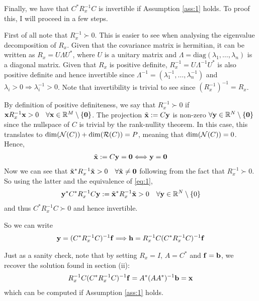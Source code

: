 \documentclass{article}
\begin{document}
\begin{enumerate}[label=(\roman*)]
        Finally, we have that $C^* R_x^{-1} C$ is invertible if Assumption \ref{ass:1} holds. To proof this, I will proceed in a few steps.
        
        First of all note that $R_x^{-1} \succ 0$. This is easier to see when analysing the eigenvalue decomposition of $R_x$. Given that the covariance matrix is hermitian, it can be written as $R_x = U \Lambda U^*$, where $U$ is a unitary matrix and $\Lambda = \text{diag}(\lambda_1,\dots, \lambda_n)$ is a diagonal matrix. Given that $R_x$ is positive definite, $R_x^{-1} = U \Lambda^{-1} U^*$ is also positive definite and hence invertible since $\Lambda^{-1} = (\lambda_1^{-1},\dots, \lambda_n^{-1})$ and $\lambda_i > 0 \Longrightarrow \lambda_i^{-1} > 0$. Note that invertibility is trivial to see since $(R_x^{-1})^{-1}=R_x$.
        
        By definition of positive definiteness, we say that $R_x^{-1}\succ 0$ if $\mathbf{x} R_x^{-1} \mathbf{x} > 0\quad \forall \mathbf{x} \in \mathbb{R}^M \setminus \{\mathbf{0}\}$. The projection $\tilde{\mathbf{x}} := C \mathbf{y}$ is non-zero $\forall \mathbf{y} \in \mathbb{R}^N \setminus \{\mathbf{0}\}$ since the nullspace of $C$ is trivial by the rank-nullity theorem. In this case, this translates to $\dim(\mathcal{N}(C))+ \dim(\mathcal{R}(C))=P$, meaning that $\dim(\mathcal{N}(C))=0$. Hence,
        \begin{align}
        \tilde{\mathbf{x}}  := C \mathbf{y} = \mathbf{0} \Longleftrightarrow \mathbf{y} = \mathbf{0} \label{eq:1}
        \end{align}
        Now we can see that $\tilde{\mathbf{x}}^* R_x^{-1} \tilde{\mathbf{x}} > 0\quad \forall \tilde{\mathbf{x}} \neq \mathbf{0}$ following from the fact that $R_x^{-1} \succ 0$. So using the latter and the equivalence of \eqref{eq:1},
        \begin{align}
        \mathbf{y}^* C^* R_x^{-1} C \mathbf{y}:=\tilde{\mathbf{x}}^* R_x^{-1} \tilde{\mathbf{x}} > 0\quad \forall \mathbf{y} \in \mathbb{R}^N \setminus \{0\}
        \end{align}
        and thus $C^* R_x^{-1} C \succ 0$ and hence invertible.
        
        So we can write
        \begin{align}
            \mathbf{y} = (C^* R_x^{-1} C)^{-1} \mathbf{f} \Longrightarrow \mathbf{h} = R_x^{-1} C (C^* R_x^{-1} C)^{-1} \mathbf{f}
        \end{align}
        
        Just as a sanity check, note that by setting $R_x = I$, $A = C^*$ and $\mathbf{f} = \mathbf{b}$, we recover the solution found in section (ii):
        \begin{align}
            R_x^{-1} C (C^* R_x^{-1} C)^{-1} \mathbf{f} = A^* (A A^*)^{-1} \mathbf{b} = \mathbf{x}
        \end{align}
        which can be computed if Assumption \ref{ass:1} holds.
        

\end{enumerate}
\end{document}
